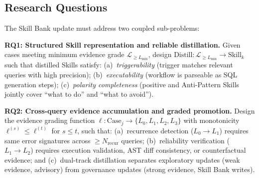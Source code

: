\subsection{Research Questions}
\label{subsec:rqs}

The Skill Bank update must address two coupled sub-problems:

\textbf{RQ1: Structured Skill representation and reliable distillation.}
Given cases meeting minimum evidence grade $\mathcal{L}_{\geq L_{\min}}$, design $\text{Distill}: \mathcal{L}_{\geq L_{\min}} \to \text{Skill}_k$ such that distilled Skills satisfy:
(a)~\emph{triggerability} (trigger matches relevant queries with high precision);
(b)~\emph{executability} (workflow is parseable as SQL generation steps);
(c)~\emph{polarity completeness} (positive and Anti-Pattern Skills jointly cover ``what to do'' and ``what to avoid'').

\textbf{RQ2: Cross-query evidence accumulation and graded promotion.}
Design the evidence grading function $\ell: \text{Case}_j \to \{L_0, L_1, L_2, L_3\}$ with monotonicity $\ell^{(s)} \leq \ell^{(t)}$ for $s \leq t$, such that:
(a)~recurrence detection ($L_0 \to L_1$) requires same error signatures across $\geq N_{\text{recur}}$ queries;
(b)~reliability verification ($L_1 \to L_2$) requires execution validation, AST diff consistency, or counterfactual evidence;
and (c)~dual-track distillation separates exploratory updates (weak evidence, advisory) from governance updates (strong evidence, Skill Bank writes).
